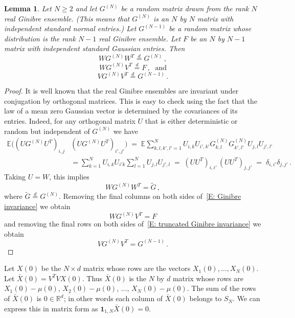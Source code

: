 \documentclass[12pt]{article}
\newtheorem{lemma}{Lemma}
\newcommand{\1}{\mathbf{1}}
\begin{document}
\begin{lemma}\label{lem: Ginibre ensembles}
Let $N \ge 2$ and let $G^{(N)}$ be a random matrix drawn from the rank $N$ real Ginibre ensemble. (This means that $G^{(N)}$ is an $N$ by $N$ matrix with independent standard normal entries.) Let $G^{(N-1)}$ be a random matrix whose distribution is the rank $N-1$ real Ginibre ensemble. Let $F$ be an $N$ by $N-1$ matrix with independent standard Gaussian entries. Then 
$$
W G^{(N)} W^T \stackrel{d}{=} G^{(N)}\,,
$$
$$ 
W G^{(N)} V^T \stackrel{d}{=} F\,,\; \text{ and}
$$
$$
VG^{(N)} V^T \stackrel{d}{=} G^{(N-1)}\,.
$$
\end{lemma}
\begin{proof}
It is well known that the real Ginibre ensembles are invariant under conjugation by orthogonal matrices. This is easy to check using the fact that the law of a mean zero Gaussian vector is determined by the covariances of its entries. Indeed, for any orthogonal matrix $U$ that is either deterministic or random but independent of $G^{(N)}$ we have
\begin{align*}
\mathbb{E}((U G^{(N)} U^T)_{i,j}&(U G^{(N)} U^T)_{i',j'})  \;=\; \mathbb{E} \sum_{k,l,k',l' = 1}^{N} U_{i,k} U_{i',k'} G^{(N)}_{k,l} G^{(N)}_{k',l'} U_{j,l} U_{j',l'}\\ 
& = \sum_{k=1}^N U_{i,k}U_{i'k} \sum_{l=1}^N U_{j,l}U_{j',l} 
 \;=\; (UU^T)_{i,i'}\,(UU^T)_{j,j'} \;=\; \delta_{i,i'}\delta_{j,j'}\,.
\end{align*}
Taking $U = W$, this implies 
\begin{equation}\label{E: Ginibre invariance} W G^{(N)} W^T  = \tilde{G}\,,\end{equation}
where $\tilde{G} \stackrel{d}{=} G^{(N)}$.  Removing the final columns on both sides of~\eqref{E: Ginibre invariance} we obtain
\begin{equation}\label{E: truncated Ginibre invariance} W G^{(N)} V^T  = F \end{equation}
and removing the final rows on both sides of~\eqref{E: truncated Ginibre invariance} we obtain
{$$ V G^{(N)} V^T = G^{(N-1)}\,.$$}
\end{proof}

Let $X(0)$ be the $N\times d$ matrix whose rows are the vectors $X_1(0), \dots, X_N(0)$. Let $\bar{X}(0) = V^TV X(0)$.  Thus $\bar{X}(0)$ is the $N$ by $d$ matrix whose rows are $X_1(0) - \mu(0)$, $X_2(0) - \mu(0)$, $\dots$, $X_N(0) - \mu(0)$. The sum of the rows of $\bar{X}(0)$ is $0 \in \mathbb{R}^d$; in other words each column of $\bar{X}(0)$ belongs to $S_N$. We can express this in matrix form as
$ \mathbf{1}_{1,N} \bar{X}(0) = 0$.
\end{document}
